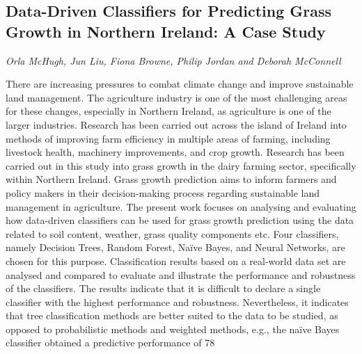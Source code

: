 \documentclass[../booklet.tex]{subfiles}
\begin{document}
\subsection[Data-Driven Classifiers for Predicting Grass Growth in Northern Ireland: A Case Study. {\it Orla McHugh, Jun Liu, Fiona Browne, Philip Jordan and Deborah McConnell}]{Data-Driven Classifiers for Predicting Grass Growth in Northern Ireland: A Case Study}
    

\begin{center}
  {\it Orla McHugh, Jun Liu, Fiona Browne, Philip Jordan and Deborah McConnell}
\end{center}


There are increasing pressures to combat climate change and improve sustainable land management. The agriculture industry is one of the most challenging areas for these changes, especially in Northern Ireland, as agriculture is one of the larger industries. Research has been carried out across the island of Ireland into methods of improving farm efficiency in multiple areas of farming, including livestock health, machinery improvements, and crop growth. Research has been carried out in this study into grass growth in the dairy farming sector, specifically within Northern Ireland. Grass growth prediction aims to inform farmers and policy makers in their decision-making process regarding sustainable land management in agriculture. The present work focuses on analysing and evaluating how data-driven classifiers can be used for grass growth prediction using the data related to soil content, weather, grass quality components etc. Four classifiers, namely Decision Trees, Random Forest, Naïve Bayes, and Neural Networks, are chosen for this purpose. Classification results based on a real-world data set are analysed and compared to evaluate and illustrate the performance and robustness of the classifiers. The results indicate that it is difficult to declare a single classifier with the highest performance and robustness. Nevertheless, it indicates that tree classification methods are better suited to the data to be studied, as opposed to probabilistic methods and weighted methods, e.g., the naïve Bayes classifier obtained a predictive performance of 78%
\end{document}
